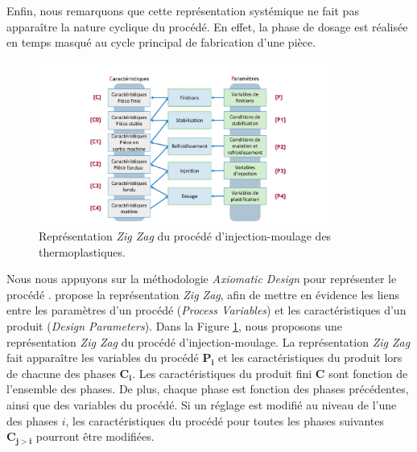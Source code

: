 
Enfin, nous remarquons que cette représentation systémique ne fait pas apparaître la nature cyclique du procédé.
En effet, la phase de dosage est réalisée en temps masqué au cycle principal de fabrication d'une pièce.

\begin{figure}[hbtp]
	\centering
	\includegraphics[width=0.85\textwidth,height=\textheight,keepaspectratio]{../Chap1/Figures/Sapristi_ZigZag.pdf}
	\caption{Représentation \textit{Zig Zag} du procédé d'injection-moulage des thermoplastiques.}
	\label{fig:zigzag}
\end{figure}

Nous nous appuyons sur la méthodologie \textit{Axiomatic Design} pour représenter le procédé \cite{suh_principles_1990}.
\citeauthor{suh_principles_1990} propose la représentation \textit{Zig Zag}, afin de mettre en évidence les liens entre les paramètres d'un procédé (\textit{Process Variables}) et les caractéristiques d'un produit (\textit{Design Parameters}).
Dans la Figure \ref{fig:zigzag}, nous proposons une représentation \textit{Zig Zag} du procédé d'injection-moulage.
La représentation \textit{Zig Zag} fait apparaître les variables du procédé $\boldsymbol{P_i}$ et les caractéristiques du produit lors de chacune des phases $\boldsymbol{C_i}$.
Les caractéristiques du produit fini $\boldsymbol{C}$ sont fonction de l’ensemble des phases.
De plus, chaque phase est fonction des phases précédentes, ainsi que des variables du procédé.
Si un réglage est modifié au niveau de l’une des phases $i$, les caractéristiques du procédé pour toutes les phases suivantes $\boldsymbol{C_{j>i}}$ pourront être modifiées.

